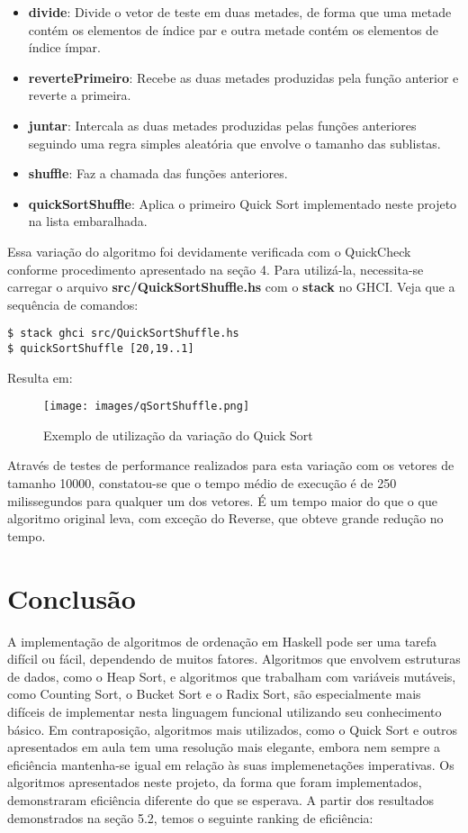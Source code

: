 \documentclass[12pt,a4paper]{article}
\begin{document}
\begin{itemize}
\item \textbf{divide}: Divide o vetor de teste em duas metades, de forma que uma metade contém os elementos de índice par e outra metade contém os elementos de índice ímpar.
\item \textbf{revertePrimeiro}: Recebe as duas metades produzidas pela função anterior e reverte a primeira.
\item \textbf{juntar}: Intercala as duas metades produzidas pelas funções anteriores seguindo uma regra simples aleatória que envolve o tamanho das sublistas.
\item \textbf{shuffle}: Faz a chamada das funções anteriores.
\item \textbf{quickSortShuffle}: Aplica o primeiro Quick Sort implementado neste projeto na lista embaralhada. 
\end{itemize}

Essa variação do algoritmo foi devidamente verificada com o QuickCheck conforme procedimento apresentado na seção 4. Para utilizá-la, necessita-se carregar o arquivo \textbf{src/QuickSortShuffle.hs} com o \textbf{stack} no GHCI. Veja que a sequência de comandos:

\begin{lstlisting}
$ stack ghci src/QuickSortShuffle.hs
$ quickSortShuffle [20,19..1]
\end{lstlisting}

Resulta em:

\begin{figure}[h]
	\centering
	\texttt{[image: images/qSortShuffle.png]}
	\caption{Exemplo de utilização da variação do Quick Sort}
\end{figure}

Através de testes de performance realizados para esta variação com os vetores de tamanho 10000, constatou-se que o tempo médio de execução é de 250 milissegundos para qualquer um dos vetores. É um tempo maior do que o que algoritmo original leva, com exceção do Reverse, que obteve grande redução no tempo. 

\section{Conclusão}
A implementação de algoritmos de ordenação em Haskell pode ser uma tarefa difícil ou fácil, dependendo de muitos fatores. Algoritmos que envolvem estruturas de dados, como o Heap Sort, e algoritmos que trabalham com variáveis mutáveis, como Counting Sort, o Bucket Sort e o Radix Sort, são especialmente mais difíceis de implementar nesta linguagem funcional utilizando seu conhecimento básico. Em contraposição, algoritmos mais utilizados, como o Quick Sort e outros apresentados em aula tem uma resolução mais elegante, embora nem sempre a eficiência mantenha-se igual em relação às suas implemenetações imperativas. Os algoritmos apresentados neste projeto, da forma que foram implementados, demonstraram eficiência diferente do que se esperava. A partir dos resultados demonstrados na seção 5.2, temos o seguinte ranking de eficiência:
\end{document}

